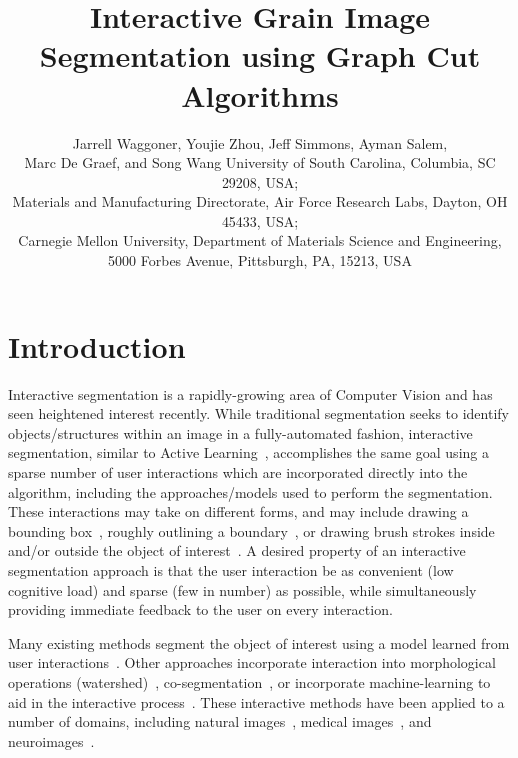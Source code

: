 \documentclass[]{spie}  %
\title{Interactive Grain Image Segmentation using Graph Cut Algorithms}
\author{Jarrell Waggoner\supit{a}, Youjie Zhou\supit{a}, Jeff Simmons\supit{b}, Ayman Salem\supit{b}, \\ Marc De Graef\supit{c}, and Song Wang\supit{a}
\skiplinehalf
\supit{a}University of South Carolina, Columbia, SC 29208, USA; \\
\supit{b}Materials and Manufacturing Directorate, Air Force Research
Labs, Dayton, OH 45433, USA; \\
\supit{c} Carnegie Mellon University, Department of Materials Science and Engineering, 5000 Forbes Avenue, Pittsburgh, PA, 15213, USA
}
\begin{document}
 
  \maketitle 

\begin{abstract}
% 

\end{abstract}




\section{Introduction}
\label{sec:intro}

Interactive segmentation is a rapidly-growing area of Computer Vision
and has seen heightened interest recently\cite{kuang:12,straehle:12}.
While traditional segmentation seeks to identify objects/structures
within an image in a fully-automated fashion, interactive
segmentation, similar to Active Learning~\cite{settles:09},
accomplishes the same goal using a sparse number of user interactions
which are incorporated directly into the algorithm, including the
approaches/models used to perform the segmentation.  These
interactions may take on different forms, and may include drawing a
bounding box~\cite{rother:04}, roughly outlining a
boundary~\cite{mortensen:95}, or drawing brush strokes inside and/or
outside the object of interest~\cite{santner:10, unger:08, boykov:01b,
  vezhnevets:95}.  A desired property of an interactive segmentation
approach is that the user interaction be as convenient (\ie low
cognitive load) and sparse (\ie few in number) as possible, while
simultaneously providing immediate feedback to the user on every
interaction.

Many existing methods segment the object of interest using a model
learned from user interactions~\cite{boykov:01b, unger:08, rother:04}.
Other approaches incorporate interaction into morphological operations
(watershed)~\cite{straehle:12}, co-segmentation~\cite{batra:10}, or
incorporate machine-learning to aid in the interactive
process~\cite{top:11, kuang:12}.  These interactive methods have been
applied to a number of domains, including natural
images~\cite{rother:04}, medical images~\cite{boykov:00}, and
neuroimages~\cite{straehle:11, straehle:12}.
\end{document}
